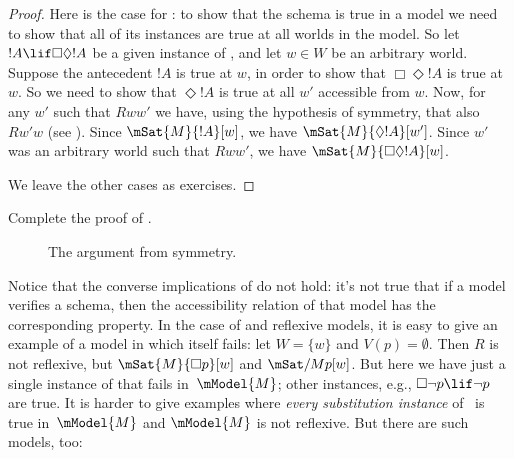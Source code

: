 \documentclass[../../../include/open-logic-section]{subfiles}
\begin{document}
\begin{proof}
  Here is the case for : to show that the schema is true in a
  model we need to show that all of its instances are true at all worlds
  in the model. So let $!A \lif \Box\Diamond !A$ be a given instance
  of , and let $w \in W$ be an arbitrary world. Suppose the
  antecedent $!A$ is true at $w$, in order to show that $\Box \Diamond
  !A$ is true at $w$. So we need to show that $\Diamond !A$ is true at
  all $w'$ accessible from $w$. Now, for any $w'$ such that $Rww'$ we
  have, using the hypothesis of symmetry, that also $Rw'w$ (see
  ). Since $\mSat{M}{!A}[w]$, we have
  $\mSat{M}{\Diamond !A}[w']$. Since $w'$ was an arbitrary world such
  that $Rww'$, we have $\mSat{M}{\Box\Diamond!A}[w]$.

  We leave the other cases as exercises.
\end{proof}

\begin{prob}
  Complete the proof of .
\end{prob}

\begin{figure}
  \begin{center}
  \end{center}
\caption{The argument from symmetry.}
\end{figure}

Notice that the converse implications of  do
not hold: it's not true that if a model verifies a schema, then the
accessibility relation of that model has the corresponding property.
In the case of  and reflexive models, it is easy to give an
example of a model in which  itself fails: let $W = \{w\}$ and
$V(p) = \emptyset$. Then $R$ is not reflexive, but $\mSat{M}{\Box
  p}[w]$ and $\mSat/{M}{p}[w]$. But here we have just a single
instance of  that fails in~$\mModel{M}$; other instances, e.g.,
$\Box \lnot p \lif \lnot p$ are true. It is harder to give examples
where \emph{every substitution instance} of~ is true
in~$\mModel{M}$ and $\mModel{M}$ is not reflexive. But there are such
models, too:
\end{document}
